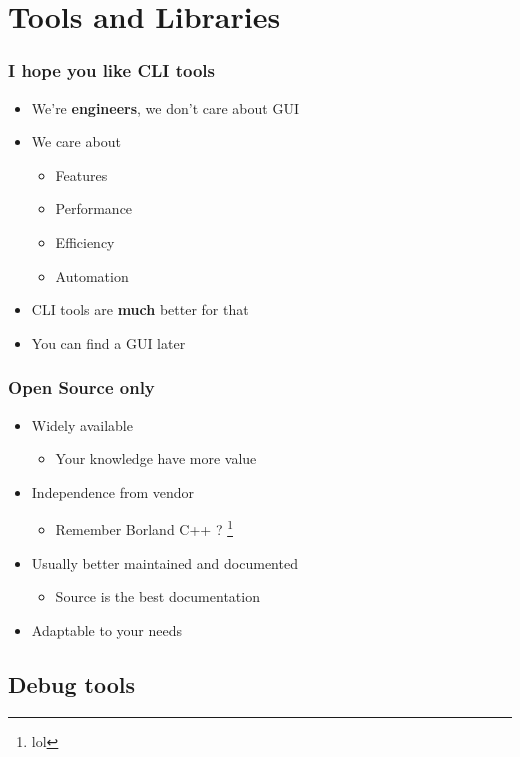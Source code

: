 \section{Tools and Libraries}
\label{sec:tools}


\begin{frame}
  \frametitle{I hope you like CLI tools}

  \begin{itemize}
  \item We're \textbf{engineers}, we don't care about GUI
  \item We care about
    \begin{itemize}
    \item Features
    \item Performance
    \item Efficiency
    \item Automation
    \end{itemize}
  \item CLI tools are \textbf{much} better for that
  \item You can find a GUI later
  \end{itemize}
\end{frame}

\begin{frame}
  \frametitle{Open Source only}

  \begin{itemize}
  \item Widely available
    \begin{itemize}
    \item Your knowledge have more value
    \end{itemize}
  \item Independence from vendor
    \begin{itemize}
    \item Remember Borland C++ ? \footnote{lol}
    \end{itemize}
  \item Usually better maintained and documented
    \begin{itemize}
    \item Source is the best documentation
    \end{itemize}
  \item Adaptable to your needs
  \end{itemize}
\end{frame}

\subsection{Debug tools}
\label{subsec:debugtools}

